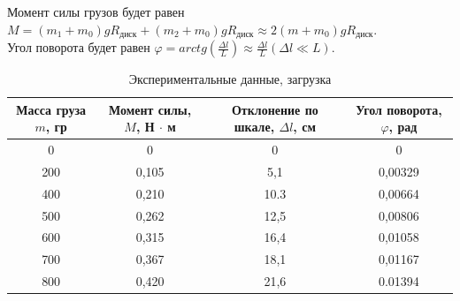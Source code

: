 \documentclass[a4paper]{article}
\begin{document}
Момент силы грузов будет равен $M = (m_{1}+m_{0})gR_{\text{диск}} + (m_{2}+m_{0})gR_{\text{диск}} \approx 2(m+m_{0})gR_{\text{диск}}$.\\
Угол поворота будет равен $\varphi = arctg(\frac{\Delta l}{L}) \approx \frac{\Delta l}{L} (\Delta l \ll L)$.

\begin{table}[h!]
\begin{center}
\begin{tabular}{|c|c|c|c|}
\hline
Масса груза $m$, гр & Момент силы, $M$, Н $\cdot$ м & Отклонение по шкале, $\Delta l$, см & Угол поворота, $\varphi$, рад \\ \hline
0                        & 0                             & 0                                 & 0                             \\ \hline
200                      & 0,105                         & 5,1                               & 0,00329                      \\ \hline
400                      & 0,210                         & 10.3                              & 0,00664                      \\ \hline
500                      & 0,262                         & 12,5                              & 0,00806                      \\ \hline
600                      & 0,315                         & 16,4                              & 0,01058                          \\ \hline
700                      & 0,367                         & 18,1                              & 0,01167                   \\ \hline
800                      & 0,420                         & 21,6                              & 0.01394                    \\ \hline
\end{tabular}
\caption{Экспериментальные данные, загрузка}
\end{center}
\end{table}
\end{document}
